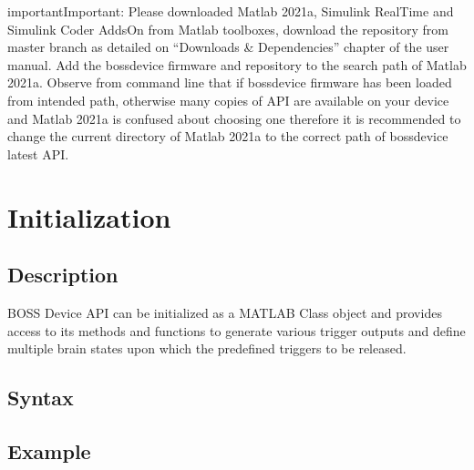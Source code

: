 \documentclass[letterpaper,10pt,english]{sphinxmanual}
\begin{document}
\begin{sphinxadmonition}{important}{Important:}
Please downloaded Matlab 2021a, Simulink Real\sphinxhyphen{}Time and Simulink Coder Adds\sphinxhyphen{}On from Matlab toolboxes, download the repository from master branch as detailed on “Downloads \& Dependencies” chapter of the user manual. Add the bossdevice firmware and repository to the search path of Matlab 2021a. Observe from command line that if bossdevice firmware has been loaded from intended path, otherwise many copies of API are available on your device and Matlab 2021a is confused about choosing one therefore it is recommended to change the current directory of Matlab 2021a to the correct path of bossdevice latest API.
\end{sphinxadmonition}


\section{Initialization}
\label{\detokenize{4_api_documentation:initialization}}

\subsection{Description}
\label{\detokenize{4_api_documentation:description}}
BOSS Device API can be initialized as a MATLAB Class object and provides access to its methods and functions to generate various trigger outputs and define multiple brain states upon which the predefined triggers to be released.


\subsection{Syntax}
\label{\detokenize{4_api_documentation:syntax}}
\begin{sphinxVerbatim}[commandchars=\\\{\}]
\PYG{p}{[}\PYG{p}{]}  
\end{sphinxVerbatim}


\subsection{Example}
\label{\detokenize{4_api_documentation:example}}
\begin{sphinxVerbatim}[commandchars=\\\{\}]
 
\end{sphinxVerbatim}
\end{document}
